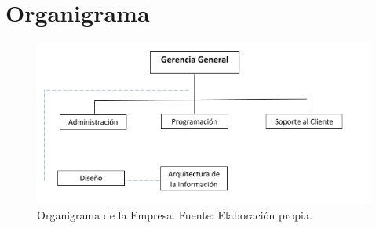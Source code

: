\pagebreak
\section{Organigrama}
\begin{figure}[hbt]
\begin{center}
\includegraphics[scale=0.8]{organigrama}
\caption{Organigrama de la Empresa. Fuente: Elaboración propia.}
\label{fig:figura1}
\end{center}
\end{figure}
